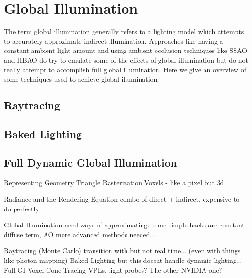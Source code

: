 \section{Global Illumination}
The term global illumination generally refers to a lighting model which attempts to accurately approximate indirect illumination. Approaches like having a constant ambient light amount and using ambient occlusion techniques like SSAO and HBAO do try to emulate some of the effects of global illumination but do not really attempt to accomplish full global illumination. Here we give an overview of some techniques used to achieve global illumination.

\subsection{Raytracing}

\subsection{Baked Lighting}

\subsection{Full Dynamic Global Illumination}





Representing Geometry
    Triangle Rasterization
    Voxels - like a pixel but 3d

Radiance and the Rendering Equation
    combo of direct + indirect, expensive to do perfectly

Global Illumination
    need ways of approximating. some simple hacks are constant diffuse term, AO
    more advanced methods needed...

    Raytracing (Monte Carlo)
        transition with but not real time... (even with things like photon mapping)
    Baked Lighting
        but this doesnt handle dynamic lighting...
    Full GI
        Voxel Cone Tracing
        VPLs, light probes?
        The other NVIDIA one?
